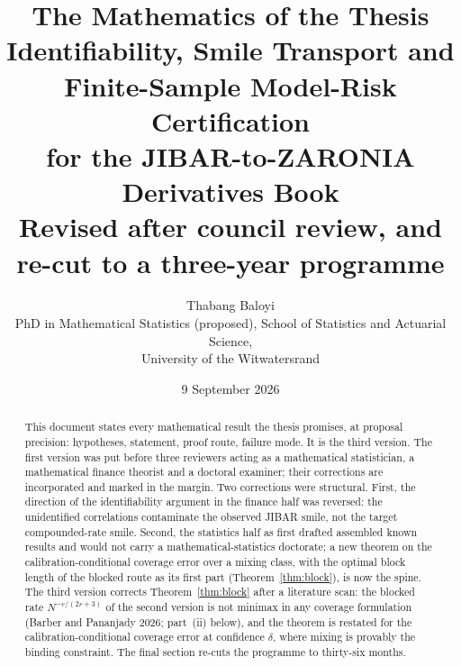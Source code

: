 \documentclass[11pt,a4paper]{article}
\title{\Large The Mathematics of the Thesis\\[4pt]
\large Identifiability, Smile Transport and Finite-Sample Model-Risk Certification\\ for the JIBAR-to-ZARONIA Derivatives Book\\[8pt]
\normalsize Revised after council review, and re-cut to a three-year programme}
\author{Thabang Baloyi\\ \small PhD in Mathematical Statistics (proposed), School of Statistics and Actuarial Science,\\ \small University of the Witwatersrand}
\date{9 September 2026}
\theoremstyle{plain}
\theoremstyle{definition}
\theoremstyle{remark}
\begin{document}
\maketitle

\begin{abstract}
\noindent This document states every mathematical result the thesis promises, at proposal precision: hypotheses, statement, proof route, failure mode. It is the third version. The first version was put before three reviewers acting as a mathematical statistician, a mathematical finance theorist and a doctoral examiner; their corrections are incorporated and marked in the margin. Two corrections were structural. First, the direction of the identifiability argument in the finance half was reversed: the unidentified correlations contaminate the observed JIBAR smile, not the target compounded-rate smile. Second, the statistics half as first drafted assembled known results and would not carry a mathematical-statistics doctorate; a new theorem on the calibration-conditional coverage error over a mixing class, with the optimal block length of the blocked route as its first part (Theorem~\ref{thm:block}), is now the spine. The third version corrects Theorem~\ref{thm:block} after a literature scan: the blocked rate $N^{-r/(2r+3)}$ of the second version is not minimax in any coverage formulation (Barber and Pananjady 2026; part~(ii) below), and the theorem is restated for the calibration-conditional coverage error at confidence $\delta$, where mixing is provably the binding constraint. The final section re-cuts the programme to thirty-six months.
\end{abstract}
\end{document}
